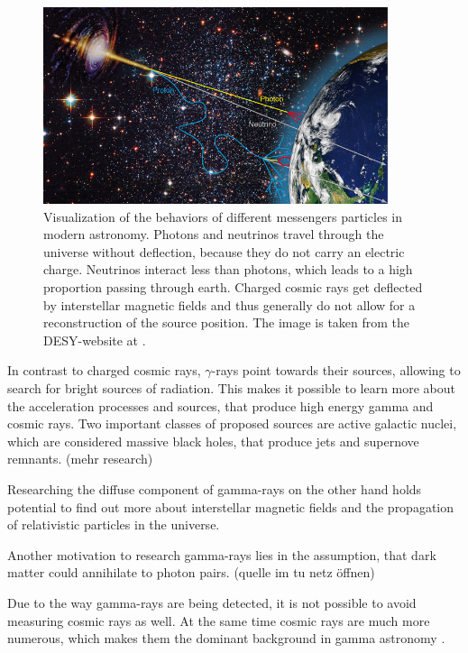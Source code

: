 \begin{figure}
	\centering
	\captionsetup{width=0.9\linewidth}
	\includegraphics[width=0.9\textwidth]{images/astro-web-titel.jpg}
	\caption{Visualization of the behaviors of different messengers
		particles in modern astronomy.
		Photons and neutrinos travel through the universe without deflection,
		because they do not carry an electric charge.
		Neutrinos interact less than photons,
		which leads to a high proportion passing through earth.
		Charged cosmic rays get deflected by interstellar
		magnetic fields and thus generally do not allow for a reconstruction
		of the source position.
		The image is taken from the DESY-website at \cite{desy_mm_astro}.
	}
	\label{fig:multi_messenger}
\end{figure}

In contrast to charged cosmic rays, $\gamma$-rays point towards
their sources, allowing to search for bright sources of radiation.
This makes it possible to learn more about the acceleration processes
and sources, that produce high energy gamma and cosmic rays.
Two important classes of proposed sources are active galactic nuclei,
which are considered massive black holes, that produce jets and 
supernove remnants. (mehr research)

Researching the diffuse component of gamma-rays on the other hand holds
potential to find out more about interstellar magnetic fields and the
propagation of relativistic particles in the universe.

Another motivation to research gamma-rays lies in the assumption, that
dark matter could annihilate to photon pairs. (quelle im tu netz öffnen)

Due to the way gamma-rays are being detected, it is not possible
to avoid measuring cosmic rays as well.
At the same time cosmic rays are much more numerous,
which makes them the dominant background in gamma astronomy \cite{funcray}.

